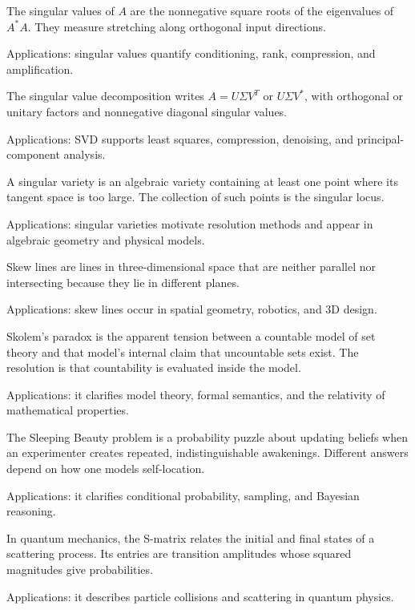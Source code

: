 The singular values of $A$ are the nonnegative square roots of the eigenvalues of $A^*A$. They measure stretching along orthogonal input directions. \par\noindent Applications: singular values quantify conditioning, rank, compression, and amplification.

The singular value decomposition writes $A=U\Sigma V^T$ or $U\Sigma V^*$, with orthogonal or unitary factors and nonnegative diagonal singular values. \par\noindent Applications: SVD supports least squares, compression, denoising, and principal-component analysis.

A singular variety is an algebraic variety containing at least one point where its tangent space is too large. The collection of such points is the singular locus. \par\noindent Applications: singular varieties motivate resolution methods and appear in algebraic geometry and physical models.

Skew lines are lines in three-dimensional space that are neither parallel nor intersecting because they lie in different planes. \par\noindent Applications: skew lines occur in spatial geometry, robotics, and 3D design.

Skolem's paradox is the apparent tension between a countable model of set theory and that model's internal claim that uncountable sets exist. The resolution is that countability is evaluated inside the model. \par\noindent Applications: it clarifies model theory, formal semantics, and the relativity of mathematical properties.

The Sleeping Beauty problem is a probability puzzle about updating beliefs when an experimenter creates repeated, indistinguishable awakenings. Different answers depend on how one models self-location. \par\noindent Applications: it clarifies conditional probability, sampling, and Bayesian reasoning.

In quantum mechanics, the S-matrix relates the initial and final states of a scattering process. Its entries are transition amplitudes whose squared magnitudes give probabilities. \par\noindent Applications: it describes particle collisions and scattering in quantum physics.

